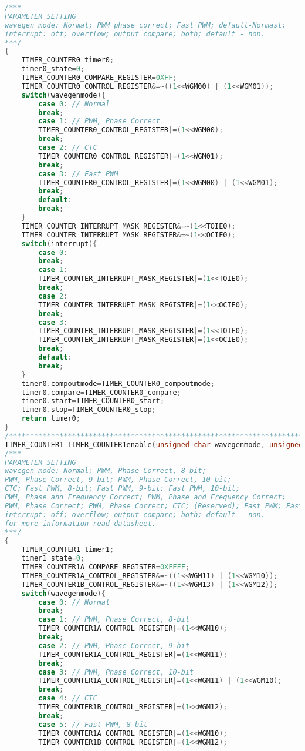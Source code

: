 \begin{lstlisting}[language=C]
/***
PARAMETER SETTING
wavegen mode: Normal; PWM phase correct; Fast PWM; default-Normasl;
interrupt: off; overflow; output compare; both; default - non.
***/
{
	TIMER_COUNTER0 timer0;
	timer0_state=0;
	TIMER_COUNTER0_COMPARE_REGISTER=0XFF;
	TIMER_COUNTER0_CONTROL_REGISTER&=~((1<<WGM00) | (1<<WGM01));
	switch(wavegenmode){
		case 0: // Normal
		break;
		case 1: // PWM, Phase Correct
		TIMER_COUNTER0_CONTROL_REGISTER|=(1<<WGM00);
		break;
		case 2: // CTC
		TIMER_COUNTER0_CONTROL_REGISTER|=(1<<WGM01);
		break;
		case 3: // Fast PWM
		TIMER_COUNTER0_CONTROL_REGISTER|=(1<<WGM00) | (1<<WGM01);
		break;
		default:
		break;
	}
	TIMER_COUNTER_INTERRUPT_MASK_REGISTER&=~(1<<TOIE0);
	TIMER_COUNTER_INTERRUPT_MASK_REGISTER&=~(1<<OCIE0);
	switch(interrupt){
		case 0: 
		break;
		case 1:
		TIMER_COUNTER_INTERRUPT_MASK_REGISTER|=(1<<TOIE0);
		break;
		case 2:
		TIMER_COUNTER_INTERRUPT_MASK_REGISTER|=(1<<OCIE0);
		break;
		case 3:
		TIMER_COUNTER_INTERRUPT_MASK_REGISTER|=(1<<TOIE0);
		TIMER_COUNTER_INTERRUPT_MASK_REGISTER|=(1<<OCIE0);
		break;
		default:
		break;
	}
	timer0.compoutmode=TIMER_COUNTER0_compoutmode;
	timer0.compare=TIMER_COUNTER0_compare;
	timer0.start=TIMER_COUNTER0_start;
	timer0.stop=TIMER_COUNTER0_stop;
	return timer0;
}
/*****************************************************************************************/
TIMER_COUNTER1 TIMER_COUNTER1enable(unsigned char wavegenmode, unsigned char interrupt)
/***
PARAMETER SETTING
wavegen mode: Normal; PWM, Phase Correct, 8-bit;
PWM, Phase Correct, 9-bit; PWM, Phase Correct, 10-bit;
CTC; Fast PWM, 8-bit; Fast PWM, 9-bit; Fast PWM, 10-bit;
PWM, Phase and Frequency Correct; PWM, Phase and Frequency Correct;
PWM, Phase Correct; PWM, Phase Correct; CTC; (Reserved); Fast PWM; Fast PWM.
interrupt: off; overflow; output compare; both; default - non.
for more information read datasheet.
***/
{
	TIMER_COUNTER1 timer1;
	timer1_state=0;
	TIMER_COUNTER1A_COMPARE_REGISTER=0XFFFF;
	TIMER_COUNTER1A_CONTROL_REGISTER&=~((1<<WGM11) | (1<<WGM10));
	TIMER_COUNTER1B_CONTROL_REGISTER&=~((1<<WGM13) | (1<<WGM12));
	switch(wavegenmode){
		case 0: // Normal
		break;
		case 1: // PWM, Phase Correct, 8-bit
		TIMER_COUNTER1A_CONTROL_REGISTER|=(1<<WGM10);
		break;
		case 2:	// PWM, Phase Correct, 9-bit
		TIMER_COUNTER1A_CONTROL_REGISTER|=(1<<WGM11);
		break;
		case 3:	// PWM, Phase Correct, 10-bit
		TIMER_COUNTER1A_CONTROL_REGISTER|=(1<<WGM11) | (1<<WGM10);
		break;
		case 4:	// CTC
		TIMER_COUNTER1B_CONTROL_REGISTER|=(1<<WGM12);
		break;
		case 5:	// Fast PWM, 8-bit
		TIMER_COUNTER1A_CONTROL_REGISTER|=(1<<WGM10);
		TIMER_COUNTER1B_CONTROL_REGISTER|=(1<<WGM12);

\end{lstlisting}
